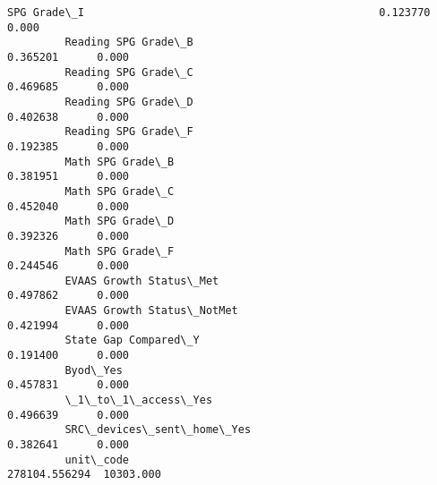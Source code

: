 \documentclass[11pt]{article}
\begin{document}
\begin{Verbatim}[commandchars=\\\{\}]
         SPG Grade\_I                                              0.123770      0.000   
         Reading SPG Grade\_B                                      0.365201      0.000   
         Reading SPG Grade\_C                                      0.469685      0.000   
         Reading SPG Grade\_D                                      0.402638      0.000   
         Reading SPG Grade\_F                                      0.192385      0.000   
         Math SPG Grade\_B                                         0.381951      0.000   
         Math SPG Grade\_C                                         0.452040      0.000   
         Math SPG Grade\_D                                         0.392326      0.000   
         Math SPG Grade\_F                                         0.244546      0.000   
         EVAAS Growth Status\_Met                                  0.497862      0.000   
         EVAAS Growth Status\_NotMet                               0.421994      0.000   
         State Gap Compared\_Y                                     0.191400      0.000   
         Byod\_Yes                                                 0.457831      0.000   
         \_1\_to\_1\_access\_Yes                                       0.496639      0.000   
         SRC\_devices\_sent\_home\_Yes                                0.382641      0.000   
         unit\_code                                           278104.556294  10303.000   
         

\end{Verbatim}
\end{document}
